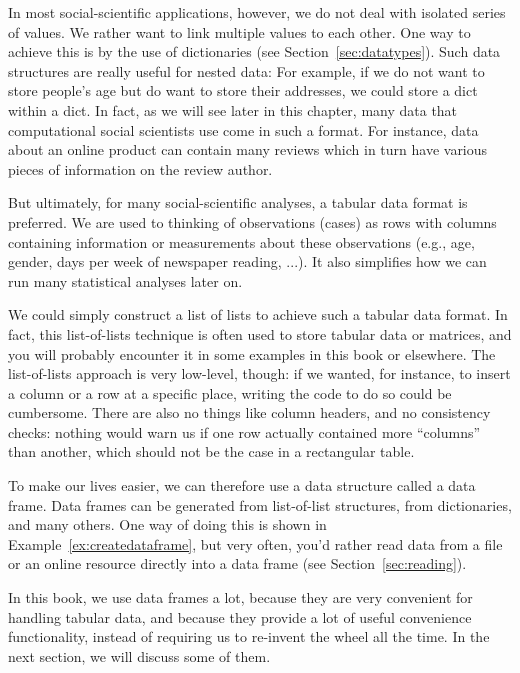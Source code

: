 In most social-scientific applications, however, we do not deal with isolated series of values. We rather want to link multiple values to each other. One way to achieve this is by the use of dictionaries (see Section~\ref{sec:datatypes}).
Such data structures are really useful for nested data:
For example, if we do not want to store people's age but do want to store their addresses,
we could store a dict within a dict.
In fact, as we will see later in this chapter, many data that computational social scientists use come in such a format.
For instance, data about an online product can contain many reviews which in turn have various pieces of information on the review author.

But ultimately, for many social-scientific analyses, a tabular data format is preferred.
We are used to thinking of observations (cases) as rows with columns containing information or measurements about these observations (e.g., age, gender, days per week of newspaper reading, ...). It also simplifies how we can run many statistical analyses later on.

We could simply construct a list of lists to achieve such a tabular data format.
In fact, this list-of-lists technique is often used to store tabular data or matrices, and you will probably encounter it in some examples in this book or elsewhere. The list-of-lists approach is very low-level, though: if we wanted, for instance, to insert a column or a row at a specific place, writing the code to do so could be cumbersome. There are also no things like column headers, and no consistency checks: nothing would warn us if one row actually contained more ``columns'' than another, which should not be the case in a rectangular table.

To make our lives easier, we can therefore use a data structure called a data frame.
Data frames can be generated from list-of-list structures, from dictionaries, and many others.
One way of doing this is shown in Example~\ref{ex:createdataframe}, but very often, you'd rather read data from a file or an online resource directly into a data frame (see Section~\ref{sec:reading}).


In this book, we use data frames a lot, because they are very convenient for handling tabular data, and because they provide a lot of useful convenience functionality, instead of requiring us to re-invent the wheel all the time. In the next section, we will discuss some of them.


